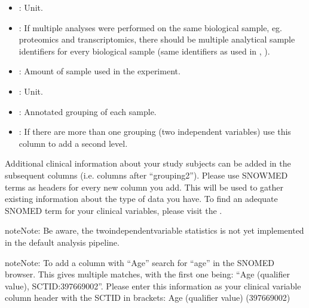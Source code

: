 \documentclass[letterpaper,10pt,english]{sphinxmanual}
\begin{document}
\begin{itemize}
\item {} 
: Unit.

\item {} 
: If multiple analyses were performed on the same biological sample, eg. proteomics and transcriptomics, there should be multiple analytical sample identifiers for every biological sample (same identifiers as used in {\hyperref[\detokenize{getting_started/upload-data:experimental-design}]{}}, ).

\item {} 
: Amount of sample used in the experiment.

\item {} 
: Unit.

\item {} 
: Annotated grouping of each sample.

\item {} 
: If there are more than one grouping (two independent variables) use this column to add a second level.

\end{itemize}

Additional clinical information about your study subjects can be added in the subsequent columns (i.e. columns after “grouping2”).
Please use SNOWMED terms as headers for every new column you add. This will be used to gather existing information about the type of data you have.
To find an adequate SNOMED term for your clinical variables, please visit the .

\begin{sphinxadmonition}{note}{Note:}
Be aware, the two\sphinxhyphen{}independent\sphinxhyphen{}variable statistics is not yet implemented in the default analysis pipeline.
\end{sphinxadmonition}

\begin{sphinxadmonition}{note}{Note:}
To add a column with “Age” search for “age” in the SNOMED browser. This gives multiple matches, with the first one being: “Age (qualifier value), SCTID:397669002”. Please enter this information as your clinical variable column header with the SCTID in brackets: Age (qualifier value) (397669002)
\end{sphinxadmonition}
\end{document}
